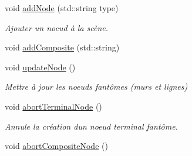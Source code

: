 \begin{DoxyCompactItemize}
\item 
void \hyperlink{group__inf2990_ga22eeedd655650984efa7da6d3d2564eb}{add\+Node} (std\+::string type)
\begin{DoxyCompactList}\small\item\em Ajouter un noeud à la scène. \end{DoxyCompactList}\item 
void \hyperlink{group__inf2990_ga84c93e92df125b294651c3bb04201624}{add\+Composite} (std\+::string)
\item 
void \hyperlink{group__inf2990_ga3d780d2a98e5abe59033ba9791065d7d}{update\+Node} ()
\begin{DoxyCompactList}\small\item\em Mettre à jour les noeuds fantômes (murs et lignes) \end{DoxyCompactList}\item 
void \hyperlink{group__inf2990_gaf1099ad811d94b7ede2572fbd3c7c89e}{abort\+Terminal\+Node} ()
\begin{DoxyCompactList}\small\item\em Annule la création d\textquotesingle{}un noeud terminal fantôme. \end{DoxyCompactList}\item 
\hypertarget{group__inf2990_gaf17fbb34428b0e0a22ffcdc245e52d19}{}void \hyperlink{group__inf2990_gaf17fbb34428b0e0a22ffcdc245e52d19}{abort\+Composite\+Node} ()\label{group__inf2990_gaf17fbb34428b0e0a22ffcdc245e52d19}


\end{DoxyCompactItemize}
